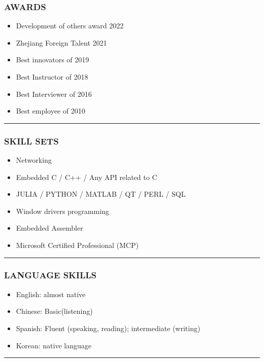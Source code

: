 \documentclass[12pt,a4paper]{article}
\begin{document}
\subsubsection{AWARDS}
\begin{itemize}
\item Development of others award 2022


\item Zhejiang Foreign Talent 2021


\item Best innovators of 2019


\item Best Instructor of 2018


\item Best Interviewer of 2016


\item Best employee of 2010

\end{itemize}
\rule{\textwidth}{1pt}
\subsubsection{SKILL SETS}
\begin{itemize}
\item Networking


\item Embedded C / C++ / Any API related to C


\item JULIA / PYTHON / MATLAB / QT / PERL / SQL


\item Window drivers programming


\item Embedded Assembler  


\item Microsoft Certified Professional (MCP)

\end{itemize}
\rule{\textwidth}{1pt}
\subsubsection{LANGUAGE SKILLS}
\begin{itemize}
\item English: almost native


\item Chinese: Basic(listening)


\item Spanish: Fluent (speaking, reading); intermediate (writing) 


\item Korean: native language

\end{itemize}
\rule{\textwidth}{1pt}
\end{document}
